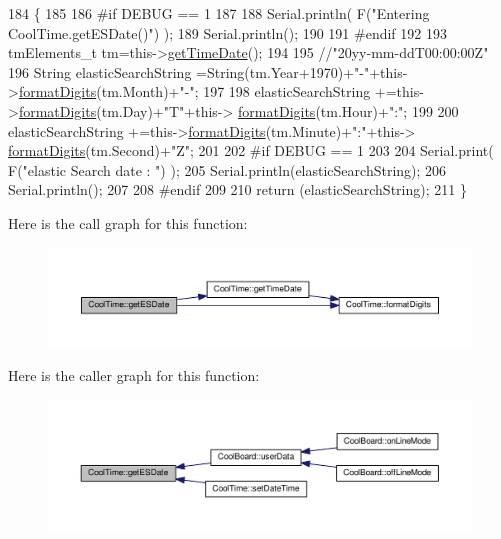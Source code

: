 \begin{DoxyCode}
184 \{
185 
186 \textcolor{preprocessor}{#if DEBUG == 1 }
187 
188     Serial.println( F(\textcolor{stringliteral}{"Entering CoolTime.getESDate()"}) );
189     Serial.println();
190 
191 \textcolor{preprocessor}{#endif }
192 
193     tmElements\_t tm=this->\hyperlink{class_cool_time_a7a7501c5ca77dd1248bea704c44f986c}{getTimeDate}();
194 
195     \textcolor{comment}{//"20yy-mm-ddT00:00:00Z"}
196     String elasticSearchString =String(tm.Year+1970)+\textcolor{stringliteral}{"-"}+this->\hyperlink{class_cool_time_acd537cd4210d7bde4e1f5c47d2ac0456}{formatDigits}(tm.Month)+\textcolor{stringliteral}{"-"};
197 
198     elasticSearchString +=this->\hyperlink{class_cool_time_acd537cd4210d7bde4e1f5c47d2ac0456}{formatDigits}(tm.Day)+\textcolor{stringliteral}{"T"}+this->
      \hyperlink{class_cool_time_acd537cd4210d7bde4e1f5c47d2ac0456}{formatDigits}(tm.Hour)+\textcolor{stringliteral}{":"};
199     
200     elasticSearchString +=this->\hyperlink{class_cool_time_acd537cd4210d7bde4e1f5c47d2ac0456}{formatDigits}(tm.Minute)+\textcolor{stringliteral}{":"}+this->
      \hyperlink{class_cool_time_acd537cd4210d7bde4e1f5c47d2ac0456}{formatDigits}(tm.Second)+\textcolor{stringliteral}{"Z"};
201 
202 \textcolor{preprocessor}{#if DEBUG == 1 }
203 
204     Serial.print( F(\textcolor{stringliteral}{"elastic Search date : "}) );
205     Serial.println(elasticSearchString);
206     Serial.println();
207 
208 \textcolor{preprocessor}{#endif}
209 
210     \textcolor{keywordflow}{return} (elasticSearchString);
211 \}
\end{DoxyCode}
Here is the call graph for this function\+:\nopagebreak
\begin{figure}[H]
\begin{center}
\leavevmode
\includegraphics[width=350pt]{d6/d49/class_cool_time_ac4f32ee513c1328d984306645e8785a4_cgraph}
\end{center}
\end{figure}
Here is the caller graph for this function\+:\nopagebreak
\begin{figure}[H]
\begin{center}
\leavevmode
\includegraphics[width=350pt]{d6/d49/class_cool_time_ac4f32ee513c1328d984306645e8785a4_icgraph}
\end{center}
\end{figure}
